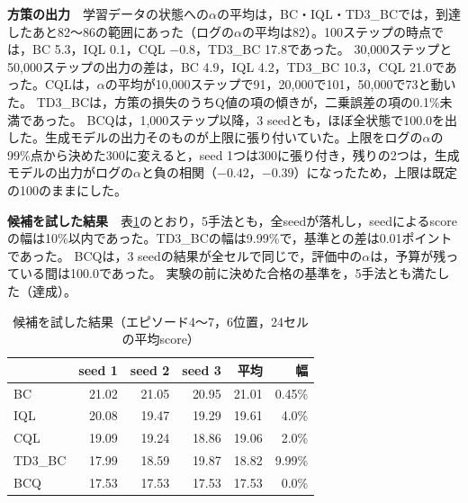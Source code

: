 \documentclass[twocolumn, 10pt]{ujarticle}
\begin{document}
\textbf{方策の出力}　学習データの状態への$\alpha$の平均は，BC・IQL・TD3\_BCでは，到達したあと82〜86の範囲にあった（ログの$\alpha$の平均は82）。100ステップの時点では，BC 5.3，IQL 0.1，CQL $-0.8$，TD3\_BC 17.8であった。
30,000ステップと50,000ステップの出力の差は，BC 4.9，IQL 4.2，TD3\_BC 10.3，CQL 21.0であった。CQLは，$\alpha$の平均が10,000ステップで91，20,000で101，50,000で73と動いた。
TD3\_BCは，方策の損失のうちQ値の項の傾きが，二乗誤差の項の0.1\%未満であった。
BCQは，1,000ステップ以降，3 seedとも，ほぼ全状態で100.0を出した。生成モデルの出力そのものが上限に張り付いていた。上限をログの$\alpha$の99\%点から決めた300に変えると，seed 1つは300に張り付き，残りの2つは，生成モデルの出力がログの$\alpha$と負の相関（$-0.42$，$-0.39$）になったため，上限は既定の100のままにした。

\textbf{候補を試した結果}　表\ref{tab:try}のとおり，5手法とも，全seedが落札し，seedによるscoreの幅は10\%以内であった。TD3\_BCの幅は9.99\%で，基準との差は0.01ポイントであった。
BCQは，3 seedの結果が全セルで同じで，評価中の$\alpha$は，予算が残っている間は100.0であった。
実験の前に決めた合格の基準を，5手法とも満たした（達成）。

\begin{table}[H]
\centering
\caption{候補を試した結果（エピソード4〜7，6位置，24セルの平均score）}
\label{tab:try}
\footnotesize\setlength{\tabcolsep}{4pt}
\begin{tabularx}{\linewidth}{@{}Xrrrrr@{}}
\toprule
 & seed 1 & seed 2 & seed 3 & 平均 & 幅 \\
\midrule
BC & 21.02 & 21.05 & 20.95 & 21.01 & 0.45\% \\
IQL & 20.08 & 19.47 & 19.29 & 19.61 & 4.0\% \\
CQL & 19.09 & 19.24 & 18.86 & 19.06 & 2.0\% \\
TD3\_BC & 17.99 & 18.59 & 19.87 & 18.82 & 9.99\% \\
BCQ & 17.53 & 17.53 & 17.53 & 17.53 & 0.0\% \\
\bottomrule
\end{tabularx}
\end{table}
\end{document}
